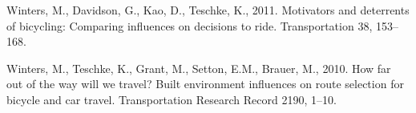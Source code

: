 \documentclass[
]{article}
\newlength{\cslhangindent}
\newlength{\cslentryspacingunit} %
\newenvironment{CSLReferences}[2] %
 {%
  \setlength{\parindent}{0pt}
  \ifodd #1
  \let\oldpar\par
  \def\par{\hangindent=\cslhangindent\oldpar}
  \fi
  \setlength{\parskip}{#2\cslentryspacingunit}
 }%
 {}
\begin{document}
\begin{CSLReferences}{1}{0}
\leavevmode{}%
Winters, M., Davidson, G., Kao, D., Teschke, K., 2011. Motivators and deterrents of bicycling: Comparing influences on decisions to ride. Transportation 38, 153--168.

\leavevmode{}%
Winters, M., Teschke, K., Grant, M., Setton, E.M., Brauer, M., 2010. How far out of the way will we travel? Built environment influences on route selection for bicycle and car travel. Transportation Research Record 2190, 1--10.

\end{CSLReferences}
\end{document}
